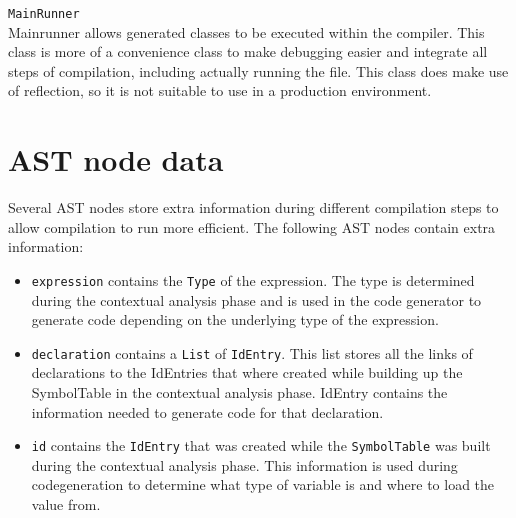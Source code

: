 \noindent\texttt{MainRunner}\\
Mainrunner allows generated classes to be executed within the compiler. This class is more of a convenience class to make debugging easier and integrate all steps of compilation, including actually running the file. This class does make use of reflection, so it is not suitable to use in a production environment.



\section{AST node data}
Several AST nodes store extra information during different compilation steps to allow compilation to run more efficient. The following AST nodes contain extra information:

\begin{itemize}
\item \texttt{expression} contains the \texttt{Type} of the expression. The type is determined during the contextual analysis phase and is used in the code generator to generate code depending on the underlying type of the expression.
\item \texttt{declaration} contains a \texttt{List} of \texttt{IdEntry}. This list stores all the links of declarations to the IdEntries that where created while building up the SymbolTable in the contextual analysis phase. IdEntry contains the information needed to generate code for that declaration.
\item \texttt{id} contains the \texttt{IdEntry} that was created while the \texttt{SymbolTable} was built during the contextual analysis phase. This information is used during codegeneration to determine what type of variable is and where to load the value from.
\end{itemize}